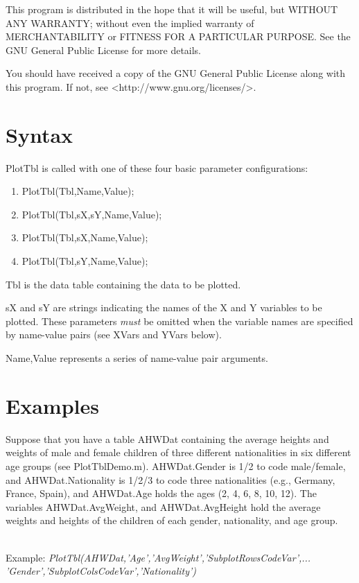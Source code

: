 \documentclass{article}
\newcommand{\example}[1]{\mbox{ } \\ Example: {\it #1} \\ }
\begin{document}
This program is distributed in the hope that it will be useful,
but WITHOUT ANY WARRANTY; without even the implied warranty of
MERCHANTABILITY or FITNESS FOR A PARTICULAR PURPOSE.  See the
GNU General Public License for more details.

You should have received a copy of the GNU General Public License
along with this program.  If not, see <http://www.gnu.org/licenses/>.

\section{Syntax}

PlotTbl is called with one of these four basic parameter configurations:
\begin{enumerate}
\item PlotTbl(Tbl,Name,Value);
\item PlotTbl(Tbl,sX,sY,Name,Value);
\item PlotTbl(Tbl,sX,Name,Value);
\item PlotTbl(Tbl,sY,Name,Value);
\end{enumerate}

Tbl is the data table containing the data to be plotted.

sX and sY are strings indicating the names of the X and Y variables to be plotted.
These parameters \emph{must} be omitted when the variable names are specified by name-value pairs
(see XVars and YVars below).

Name,Value represents a series of name-value pair arguments.

\section{Examples}

Suppose that you have a table AHWDat containing the average heights and weights of male
and female children of three different nationalities in six different age groups (see PlotTblDemo.m).
AHWDat.Gender is 1/2 to code male/female, and AHWDat.Nationality is 1/2/3 to code three nationalities
(e.g., Germany, France, Spain), and AHWDat.Age holds the ages (2, 4, 6, 8, 10, 12).
The variables AHWDat.AvgWeight, and AHWDat.AvgHeight hold the average
weights and heights of the children of each gender, nationality, and age group.

\example{PlotTbl(AHWDat,'Age','AvgWeight','SubplotRowsCodeVar',... \\
'Gender','SubplotColsCodeVar','Nationality')}
\end{document}

